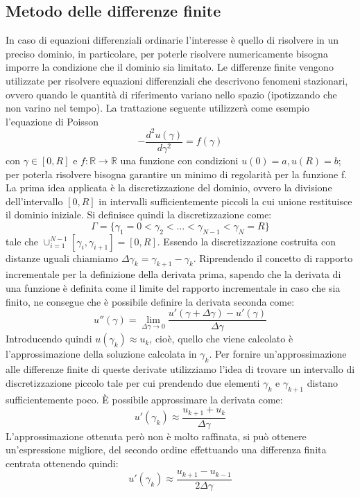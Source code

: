 \subsection{Metodo delle differenze finite}\label{appendix:diff}
In caso di equazioni differenziali ordinarie l'interesse è quello di risolvere in un preciso dominio, in particolare, per poterle risolvere numericamente bisogna imporre la condizione che il dominio sia limitato. Le differenze finite vengono utilizzate per risolvere equazioni differenziali che descrivono fenomeni stazionari, ovvero quando le quantità di riferimento variano nello spazio (ipotizzando che non varino nel tempo). La trattazione seguente utilizzerà come esempio l'equazione di Poisson
\begin{equation}
- \frac{d^2 u(\gamma)}{d\gamma^2}  =f(\gamma)
\end{equation}
con $\gamma\in[0,R]$ e $f:\mathbb{R}\rightarrow \mathbb{R}$ una funzione con condizioni $u(0)=a, u(R)=b$; per poterla risolvere bisogna garantire un minimo di regolarità per la funzione f. La prima idea applicata è la discretizzazione del dominio, ovvero la divisione dell'intervallo $[0,R]$ in intervalli sufficientemente piccoli la cui unione restituisce il dominio iniziale. Si definisce quindi la discretizzazione come:
\begin{equation}
\Gamma = \{\gamma_1 = 0 < \gamma_2 < \dots < \gamma_{N-1} < \gamma_N = R\}
\end{equation}
tale che $\cup_{i=1}^{N-1} [\gamma_i,\gamma_{i+1}] = [0,R]$. Essendo la discretizzazione costruita con distanze uguali chiamiamo $\Delta \gamma_k = \gamma_{k+1} -\gamma_k$. Riprendendo il concetto di rapporto incrementale per la definizione della derivata prima, sapendo che la derivata di una funzione è definita come il limite del rapporto incrementale in caso che sia finito, ne consegue che è possibile definire la derivata seconda come:
\begin{equation*}
u''(\gamma) = \lim_{\Delta\gamma \to 0} \frac{u'(\gamma+\Delta\gamma) -u'(\gamma)}{\Delta \gamma}
\end{equation*}
Introducendo quindi $u(\gamma_k) \approx u_k$, cioè, quello che viene calcolato è l'approssimazione della soluzione calcolata in $\gamma_k$. Per fornire un'approssimazione alle differenze finite di queste derivate utilizziamo l'idea di trovare un intervallo di discretizzazione piccolo tale per cui prendendo due elementi $\gamma_k$ e $\gamma_{k+1}$ distano sufficientemente poco. È possibile approssimare la derivata come:
\begin{equation}
u'(\gamma_k) \approx \frac{u_{k+1}+u_k}{\Delta \gamma}
\end{equation}
L'approssimazione ottenuta però non è molto raffinata, si può ottenere un'espressione migliore, del secondo ordine effettuando una differenza finita centrata ottenendo quindi:
\begin{equation}
u'(\gamma_k) \approx \frac{u_{k+1}-u_{k-1}}{2\Delta \gamma}
\end{equation}